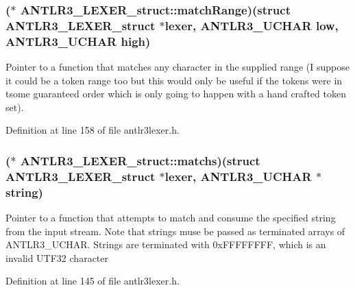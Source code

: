 \hypertarget{struct_a_n_t_l_r3___l_e_x_e_r__struct_a90cf24b209be2197848b23db2f3fdc06}{
\subsubsection[{match\-Range}]{($\ast$ A\-N\-T\-L\-R3\-\_\-\-L\-E\-X\-E\-R\-\_\-struct\-::match\-Range)(struct {\bf A\-N\-T\-L\-R3\-\_\-\-L\-E\-X\-E\-R\-\_\-struct} $\ast$lexer, {\bf A\-N\-T\-L\-R3\-\_\-\-U\-C\-H\-A\-R} low, {\bf A\-N\-T\-L\-R3\-\_\-\-U\-C\-H\-A\-R} high)}}\label{struct_a_n_t_l_r3___l_e_x_e_r__struct_a90cf24b209be2197848b23db2f3fdc06}
Pointer to a function that matches any character in the supplied range (I suppose it could be a token range too but this would only be useful if the tokens were in tsome guaranteed order which is only going to happen with a hand crafted token set). 

Definition at line 158 of file antlr3lexer.\-h.

\hypertarget{struct_a_n_t_l_r3___l_e_x_e_r__struct_a868ae254b20657e4e8a837bfcf1a4c71}{
\subsubsection[{matchs}]{($\ast$ A\-N\-T\-L\-R3\-\_\-\-L\-E\-X\-E\-R\-\_\-struct\-::matchs)(struct {\bf A\-N\-T\-L\-R3\-\_\-\-L\-E\-X\-E\-R\-\_\-struct} $\ast$lexer, {\bf A\-N\-T\-L\-R3\-\_\-\-U\-C\-H\-A\-R} $\ast$string)}}\label{struct_a_n_t_l_r3___l_e_x_e_r__struct_a868ae254b20657e4e8a837bfcf1a4c71}
Pointer to a function that attempts to match and consume the specified string from the input stream. Note that strings muse be passed as terminated arrays of A\-N\-T\-L\-R3\-\_\-\-U\-C\-H\-A\-R. Strings are terminated with 0x\-F\-F\-F\-F\-F\-F\-F\-F, which is an invalid U\-T\-F32 character 

Definition at line 145 of file antlr3lexer.\-h.

